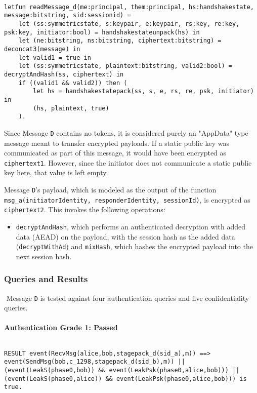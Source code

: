 \begin{lstlisting}

letfun readMessage_d(me:principal, them:principal, hs:handshakestate, message:bitstring, sid:sessionid) =
	let (ss:symmetricstate, s:keypair, e:keypair, rs:key, re:key, psk:key, initiator:bool) = handshakestateunpack(hs) in
	let (ne:bitstring, ns:bitstring, ciphertext:bitstring) = deconcat3(message) in
	let valid1 = true in
	let (ss:symmetricstate, plaintext:bitstring, valid2:bool) = decryptAndHash(ss, ciphertext) in
	if ((valid1 && valid2)) then (
		let hs = handshakestatepack(ss, s, e, rs, re, psk, initiator) in
		(hs, plaintext, true)
	).

\end{lstlisting}

Since Message \texttt{D} contains no tokens, it is considered purely an "AppData" type message meant to transfer encrypted payloads.
If a static public key was communicated as part of this message, it would have been encrypted as \texttt{ciphertext1}. However, since the initiator does not communicate a static public key here, that value is left empty.


Message \texttt{D}'s payload, which is modeled as the output of the function \texttt{msg\_a(initiatorIdentity, responderIdentity, sessionId)}, is encrypted as \texttt{ciphertext2}. This invokes the following operations:


\begin{itemize}

\item \texttt{decryptAndHash}, which performs an authenticated decryption with added data (AEAD) on the payload, with the session hash as the added data (\texttt{decryptWithAd}) and \texttt{mixHash}, which hashes the encrypted payload into the next session hash.

\end{itemize}
\subsubsection{Queries and Results}$ $
Message \texttt{D} is tested against four authentication queries and five confidentiality queries.
\paragraph{Authentication Grade 1: Passed}$ $
\begin{lstlisting}
RESULT event(RecvMsg(alice,bob,stagepack_d(sid_a),m)) ==> event(SendMsg(bob,c_1298,stagepack_d(sid_b),m)) || (event(LeakS(phase0,bob)) && event(LeakPsk(phase0,alice,bob))) || (event(LeakS(phase0,alice)) && event(LeakPsk(phase0,alice,bob))) is true.
\end{lstlisting}


